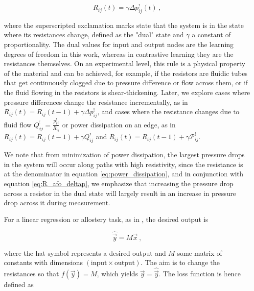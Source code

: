 \documentclass[%
 reprint,
 amsmath,amssymb,
 aps,
]{revtex4-2}
\begin{document}
{    \begin{equation}\label{eq:R_afo_deltap}
        R_{ij}\left(t\right)=\gamma \Delta p^!_{ij}\left(t\right) \ ,
    \end{equation}

     where the superscripted exclamation marks state that the system is in the state where its resistances change, defined as the "dual" state and $\gamma$ a constant of proportionality. The dual values for input and output nodes are the learning degrees of freedom in this work, whereas in contrastive learning \cite{dillavou2022demonstration} they are the resistances themselves.
     On an experimental level, this rule is a physical property of the material and can be achieved, for example, if the resistors are fluidic tubes that get continuously clogged due to pressure difference or flow across them, or if the fluid flowing in the resistors is shear-thickening. 
    Later, we explore cases where pressure differences change the resistance incrementally, as in $R_{ij}\left(t\right)=R_{ij}\left(t-1\right) + \gamma \Delta p^!_{ij}$, and cases where the resistance changes due to fluid flow $Q^!_{ij}=\frac{p^!_{ij}}{R_{ij}}$ or power dissipation on an edge, as in $R_{ij}\left(t\right) = R_{ij}\left(t-1\right) + \gamma Q^!_{ij}$ and $R_{ij}\left(t\right)=R_{ij}\left(t-1\right) + \gamma \mathcal{P}^!_{ij}$.

    We note that from minimization of power dissipation, the largest pressure drops in the system will occur along paths with high resistivity, since the resistance is at the denominator in equation \ref{eq:power_dissipation}, and in conjunction with equation \ref{eq:R_afo_deltap}, we emphasize that increasing the pressure drop across a resistor in the dual state will largely result in an increase in pressure drop across it during measurement.

    For a linear regression or allostery task, as in \cite{dillavou2022demonstration, altman2024experimental}, the desired output is

    \begin{equation}\label{eq:task}
        \widehat{\vec{y}}=M\vec{x} \ ,
    \end{equation}

    where the hat symbol represents a desired output and $M$ some matrix of constants with dimensions $\left(\text{input}\times\text{output}\right)$. 
    The aim is to change the resistances so that $f\left(\vec{y}\right)=M$, which yields $\vec{y}=\widehat{\vec{y}}$. The loss function is hence defined as

}
\end{document}
